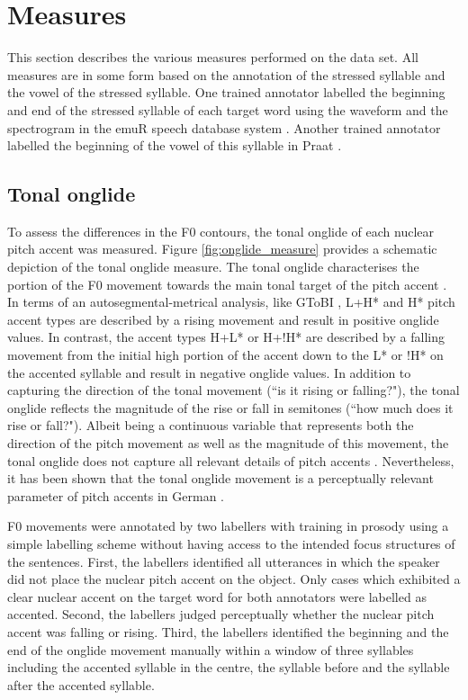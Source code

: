 \section{Measures}

This section describes the various measures performed on the data set. All measures are in some form based on the annotation of the stressed syllable and the vowel of the stressed syllable. One trained annotator labelled the beginning and end of the stressed syllable of each target word using the waveform and the spectrogram in the emuR speech database system \citep{Winkelmannetal2018}. Another trained annotator labelled the beginning of the vowel of this syllable in Praat \citep{BoersmaWeenink2018}. 

\subsection{Tonal onglide}

To assess the differences in the F0 contours, the tonal onglide of each nuclear pitch accent was measured. Figure \ref{fig:onglide_measure} provides a schematic depiction of the tonal onglide measure. The tonal onglide characterises the portion of the F0 movement towards the main tonal target of the pitch accent \citep{RitterGrice2015}. In terms of an autosegmental-metrical analysis, like GToBI \citep{GriceBaumannBenzmüller2005}, L+H* and H* pitch accent types are described by a rising movement and result in positive onglide values. In contrast, the accent types H+L* or H+!H* are described by a falling movement from the initial high portion of the accent down to the L* or !H* on the accented syllable and result in negative onglide values. In addition to capturing the direction of the tonal movement (``is it rising or falling?"), the tonal onglide reflects the magnitude of the rise or fall in semitones (``how much does it rise or fall?"). Albeit being a continuous variable that represents both the direction of the pitch movement as well as the magnitude of this movement, the tonal onglide does not capture all relevant details of pitch accents \citep{Griceetal2017}. Nevertheless, it has been shown that the tonal onglide movement is a perceptually relevant parameter of pitch accents in German \citep{BaumannRöhr2015, RitterGrice2015}.

F0 movements were annotated by two labellers with training in prosody using a simple labelling scheme without having access to the intended focus structures of the sentences. First, the labellers identified all utterances in which the speaker did not place the nuclear pitch accent on the object. Only cases which exhibited a clear nuclear accent on the target word for both annotators were labelled as accented. Second, the labellers judged perceptually whether the nuclear pitch accent was falling or rising. Third, the labellers identified the beginning and the end of the onglide movement manually within a window of three syllables including the accented syllable in the centre, the syllable before and the syllable after the accented syllable.

